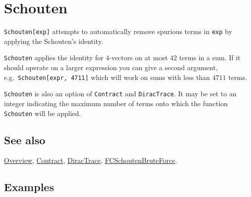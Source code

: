 \documentclass[../FeynCalcManual.tex]{subfiles}
\begin{document}
\hypertarget{schouten}{
\section{Schouten}\label{schouten}}

\texttt{Schouten[\allowbreak{}exp]} attempts to automatically remove
spurious terms in \texttt{exp} by applying the Schouten's identity.

\texttt{Schouten} applies the identity for \(4\)-vectors on at most
\(42\) terms in a sum. If it should operate on a larger expression you
can give a second argument,
e.g.~\texttt{Schouten[\allowbreak{}expr,\ \allowbreak{}4711]} which will
work on sums with less than \(4711\) terms.

\texttt{Schouten} is also an option of \texttt{Contract} and
\texttt{DiracTrace}. It may be set to an integer indicating the maximum
number of terms onto which the function \texttt{Schouten} will be
applied.

\subsection{See also}

\hyperlink{toc}{Overview}, \hyperlink{contract}{Contract},
\hyperlink{diractrace}{DiracTrace},
\hyperlink{fcschoutenbruteforce}{FCSchoutenBruteForce}.

\subsection{Examples}
\end{document}
